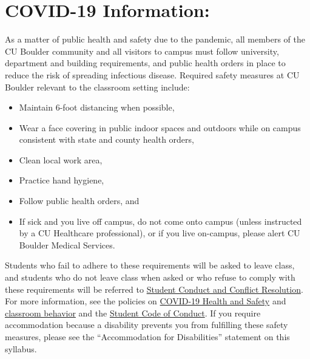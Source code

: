 \documentclass[12pt]{article}
\begin{document}

\section*{COVID-19 Information:}

As a matter of public health and safety due to the pandemic, all members of the CU Boulder community and all visitors to campus must follow university, department and building requirements, and public health orders in place to reduce the risk of spreading infectious disease. Required safety measures at CU Boulder relevant to the classroom setting include:

\begin{itemize}
	\item Maintain 6-foot distancing when possible,
	
	\item Wear a face covering in public indoor spaces and outdoors while on campus consistent with state and county health orders,
	
	\item Clean local work area,
	
	\item Practice hand hygiene, 
	
	\item Follow public health orders, and
	
	\item If sick and you live off campus, do not come onto campus (unless instructed by a CU Healthcare professional), or if you live on-campus, please alert CU Boulder Medical Services.
\end{itemize}
	
Students who fail to adhere to these requirements will be asked to leave class, and students who do not leave class when asked or who refuse to comply with these requirements will be referred to \href{https://www.colorado.edu/sccr/}{Student Conduct and Conflict Resolution}. For more information, see the policies on \href{https://www.colorado.edu/policies/covid-19-health-and-safety-policy}{COVID-19 Health and Safety} and \href{http://www.colorado.edu/policies/student-classroom-and-course-related-behavior}{classroom behavior} and the \href{http://www.colorado.edu/osccr/}{Student Code of Conduct}. If you require accommodation because a disability prevents you from fulfilling these safety measures, please see the “Accommodation for Disabilities” statement on this syllabus.
\end{document}
